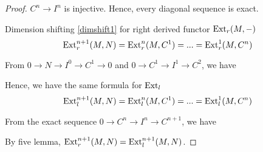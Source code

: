 \begin{proof}
	$C^n \to I^n$ is injective. Hence, every diagonal sequence is exact.
	
	Dimension shifting \ref{dimshift1} for right derived functor $\operatorname{Ext}_r(M, -)$
	$$
		\operatorname{Ext}^{n+1}_r(M, N) = \operatorname{Ext}^n_r(M, C^1) = ... = \operatorname{Ext}^1_r(M, C^n)
	$$
	
	From $0 \to N \to I^0 \to C^1 \to 0$ and $0 \to C^1 \to I^1 \to C^2$, we have
	\begin{center}
	\end{center}
	
	Hence, we have the same formula for $\operatorname{Ext}_l$
	$$
		\operatorname{Ext}^{n+1}_l(M, N) = \operatorname{Ext}^n_l(M, C^1) = ... = \operatorname{Ext}^1_l(M, C^n)
	$$
	
	From the exact sequence $0 \to C^n \to I^n \to C^{n+1}$, we have
	\begin{center}
	\end{center}
	
	By five lemma, $\operatorname{Ext}^{n+1}_r(M, N) = \operatorname{Ext}^{n+1}_l(M, N)$. 
\end{proof}

